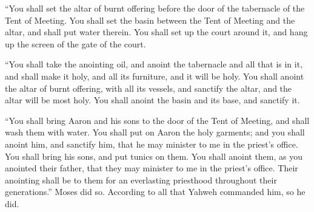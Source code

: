  ``You shall set the altar of burnt offering before the door
of the tabernacle of the Tent of Meeting.  You shall set the
basin between the Tent of Meeting and the altar, and shall put water
therein.  You shall set up the court around it, and hang up
the screen of the gate of the court.

 ``You shall take the anointing oil, and anoint the
tabernacle and all that is in it, and shall make it holy, and all its
furniture, and it will be holy.  You shall anoint the altar
of burnt offering, with all its vessels, and sanctify the altar, and the
altar will be most holy.  You shall anoint the basin and
its base, and sanctify it.

 ``You shall bring Aaron and his sons to the door of the
Tent of Meeting, and shall wash them with water.  You shall
put on Aaron the holy garments; and you shall anoint him, and sanctify
him, that he may minister to me in the priest's office. 
You shall bring his sons, and put tunics on them.  You
shall anoint them, as you anointed their father, that they may minister
to me in the priest's office. Their anointing shall be to them for an
everlasting priesthood throughout their generations.'' 
Moses did so. According to all that Yahweh commanded him, so he did.

